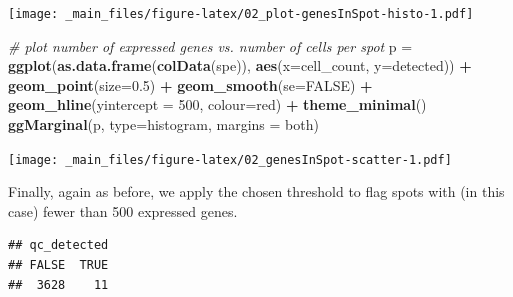 \documentclass[
]{book}
\newenvironment{Shaded}{\begin{snugshade}}{\end{snugshade}}
\newcommand{\AttributeTok}[1]{\textcolor[rgb]{0.13,0.29,0.53}{#1}}
\newcommand{\CommentTok}[1]{\textcolor[rgb]{0.56,0.35,0.01}{\textit{#1}}}
\newcommand{\ConstantTok}[1]{\textcolor[rgb]{0.56,0.35,0.01}{#1}}
\newcommand{\DecValTok}[1]{\textcolor[rgb]{0.00,0.00,0.81}{#1}}
\newcommand{\DocumentationTok}[1]{\textcolor[rgb]{0.56,0.35,0.01}{\textbf{\textit{#1}}}}
\newcommand{\FloatTok}[1]{\textcolor[rgb]{0.00,0.00,0.81}{#1}}
\newcommand{\FunctionTok}[1]{\textcolor[rgb]{0.13,0.29,0.53}{\textbf{#1}}}
\newcommand{\NormalTok}[1]{#1}
\newcommand{\OtherTok}[1]{\textcolor[rgb]{0.56,0.35,0.01}{#1}}
\newcommand{\SpecialCharTok}[1]{\textcolor[rgb]{0.81,0.36,0.00}{\textbf{#1}}}
\newcommand{\StringTok}[1]{\textcolor[rgb]{0.31,0.60,0.02}{#1}}
\begin{document}
\texttt{[image: \_main\_files/figure-latex/02\_plot-genesInSpot-histo-1.pdf]}

\begin{Shaded}
\begin{Highlighting}[]
\CommentTok{\# plot number of expressed genes vs. number of cells per spot}
\NormalTok{p }\OtherTok{=} \FunctionTok{ggplot}\NormalTok{(}\FunctionTok{as.data.frame}\NormalTok{(}\FunctionTok{colData}\NormalTok{(spe)), }\FunctionTok{aes}\NormalTok{(}\AttributeTok{x=}\NormalTok{cell\_count, }\AttributeTok{y=}\NormalTok{detected)) }\SpecialCharTok{+}
  \FunctionTok{geom\_point}\NormalTok{(}\AttributeTok{size=}\FloatTok{0.5}\NormalTok{) }\SpecialCharTok{+} 
  \FunctionTok{geom\_smooth}\NormalTok{(}\AttributeTok{se=}\ConstantTok{FALSE}\NormalTok{) }\SpecialCharTok{+}
  \FunctionTok{geom\_hline}\NormalTok{(}\AttributeTok{yintercept =} \DecValTok{500}\NormalTok{, }\AttributeTok{colour=}\StringTok{\textquotesingle{}red\textquotesingle{}}\NormalTok{) }\SpecialCharTok{+} 
  \FunctionTok{theme\_minimal}\NormalTok{()}
\FunctionTok{ggMarginal}\NormalTok{(p, }\AttributeTok{type=}\StringTok{\textquotesingle{}histogram\textquotesingle{}}\NormalTok{, }\AttributeTok{margins =} \StringTok{\textquotesingle{}both\textquotesingle{}}\NormalTok{)}
\end{Highlighting}
\end{Shaded}

\texttt{[image: \_main\_files/figure-latex/02\_genesInSpot-scatter-1.pdf]}

Finally, again as before, we apply the chosen threshold to flag spots with (in this case) fewer than 500 expressed genes.

\begin{Shaded}
\end{Shaded}

\begin{verbatim}
## qc_detected
## FALSE  TRUE 
##  3628    11
\end{verbatim}

\begin{Shaded}
\end{Shaded}
\end{document}
